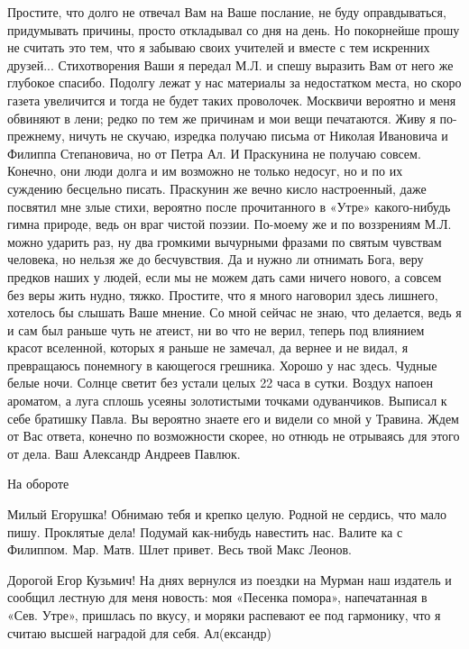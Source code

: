 \documentclass[]{memoir}
\begin{document}
Простите, что долго не отвечал Вам на Ваше послание, не буду оправдываться, придумывать причины, просто откладывал со дня на день. Но покорнейше прошу не считать это тем, что я забываю своих учителей и вместе с тем искренних друзей...  Стихотворения Ваши я передал М.Л. и спешу выразить Вам от него же глубокое спасибо. Подолгу лежат у нас материалы за недостатком места, но скоро газета увеличится и тогда не будет таких проволочек. Москвичи вероятно и меня обвиняют в лени; редко по тем же причинам и мои вещи печатаются. Живу я по-прежнему, ничуть не скучаю, изредка получаю письма от Николая Ивановича и Филиппа Степановича, но от Петра Ал. И Праскунина не получаю совсем. Конечно, они люди долга и им возможно не только недосуг, но и по их суждению бесцельно писать.
Праскунин же вечно кисло настроенный, даже посвятил мне злые стихи, вероятно после прочитанного в «Утре» какого-нибудь гимна природе, ведь он враг чистой поэзии. По-моему же и по воззрениям М.Л. можно ударить раз, ну два громкими вычурными фразами по святым чувствам человека, но нельзя же до бесчувствия. Да и нужно ли отнимать Бога, веру предков наших у людей, если мы не можем дать сами ничего нового, а совсем без веры жить нудно, тяжко.
Простите, что я много наговорил здесь лишнего, хотелось бы слышать Ваше мнение.
Со мной сейчас не знаю, что делается, ведь я и сам был раньше чуть не атеист, ни во что не верил, теперь под влиянием красот вселенной, которых я раньше не замечал, да вернее и не видал, я превращаюсь понемногу в кающегося грешника.
Хорошо у нас здесь. Чудные белые ночи. Солнце светит без устали целых 22 часа в сутки. Воздух напоен ароматом, а луга сплошь усеяны золотистыми точками одуванчиков.
Выписал к себе братишку Павла. Вы вероятно знаете его и видели со мной у Травина.
Ждем от Вас ответа, конечно по возможности скорее, но отнюдь не отрываясь для этого от дела.
              Ваш Александр Андреев Павлюк.

                                               На обороте


Милый Егорушка! Обнимаю тебя и крепко целую. Родной не сердись, что мало пишу. Проклятые дела! Подумай как-нибудь навестить нас. Валите ка с Филиппом.
  Мар. Матв. Шлет привет.
  Весь твой Макс Леонов.

Дорогой Егор Кузьмич!
На днях вернулся из поездки на Мурман наш издатель и сообщил лестную для меня новость: моя «Песенка помора», напечатанная в «Сев. Утре», пришлась по вкусу, и моряки распевают ее под гармонику, что я считаю высшей наградой для себя.
                                              Ал(ександр)
\end{document}
